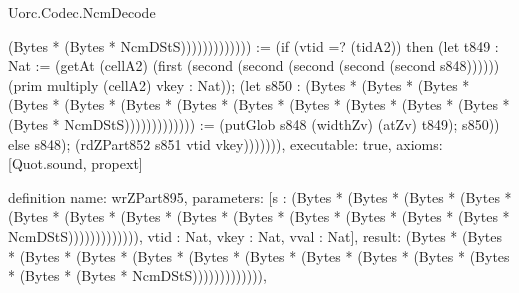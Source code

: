 \begin{lexlean}{Uorc.Codec.NcmDecode}
\begin{semanticmodule}
{(Bytes * (Bytes * NcmDStS))))))))))))) := (if (vtid =? (tidA2)) then (let t849 : Nat := (getAt (cellA2) (first (second (second (second (second (second s848)))))) (prim multiply (cellA2) vkey : Nat)); (let s850 : (Bytes * (Bytes * (Bytes * (Bytes * (Bytes * (Bytes * (Bytes * (Bytes * (Bytes * (Bytes * (Bytes * (Bytes * (Bytes * NcmDStS))))))))))))) := (putGlob s848 (widthZv) (atZv) t849); s850)) else s848); (rdZPart852 s851 vtid vkey))))))),
  executable: true,
  axioms: [Quot.sound, propext]
}

definition{
  name: wrZPart895,
  parameters: [s : (Bytes * (Bytes * (Bytes * (Bytes * (Bytes * (Bytes * (Bytes * (Bytes * (Bytes * (Bytes * (Bytes * (Bytes * (Bytes * NcmDStS))))))))))))), vtid : Nat, vkey : Nat, vval : Nat],
  result: (Bytes * (Bytes * (Bytes * (Bytes * (Bytes * (Bytes * (Bytes * (Bytes * (Bytes * (Bytes * (Bytes * (Bytes * (Bytes * NcmDStS))))))))))))),
}
\end{semanticmodule}
\end{lexlean}
